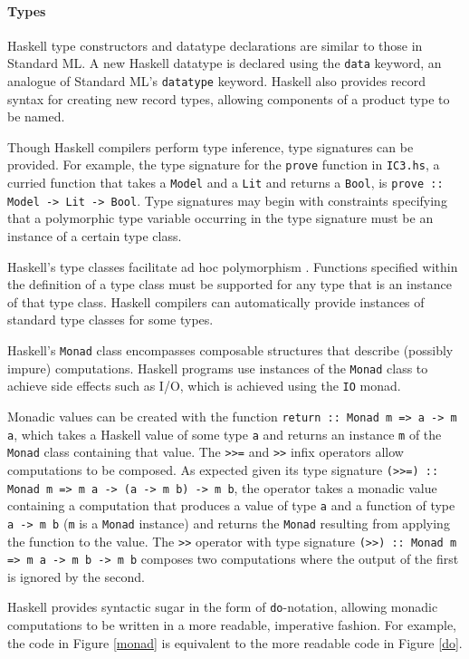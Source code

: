 \documentclass[12pt,a4paper,twoside,openright]{report}
\begin{document}
\paragraph{Types}{
Haskell type constructors and datatype declarations are similar to those in
Standard ML. A new Haskell datatype is declared using the \verb,data, keyword, an analogue
of Standard ML's \verb,datatype, keyword.
Haskell also provides record syntax for creating new record types, allowing components
of a product type to be named.

Though Haskell compilers perform type inference, type
signatures can be provided. For example, the type signature for
the \verb,prove, function in \verb,IC3.hs,, a curried function that takes
a \verb,Model, and a \verb,Lit, and returns a \verb,Bool,,
is \verb,prove :: Model -> Lit -> Bool,. Type signatures may begin with
constraints specifying that a polymorphic type variable occurring in the type
signature must be an instance of a certain type class.


Haskell's type classes facilitate ad hoc polymorphism \cite{hall94}.
Functions specified within the definition of a type class
must be supported for any type that is an instance of that type class.
Haskell compilers can automatically provide instances of standard
type classes for some types.

Haskell's \verb,Monad, class encompasses composable
structures that describe (possibly impure) computations.
Haskell programs use instances of the
\verb,Monad, class to achieve side effects such as I/O, which is
achieved using the \verb,IO, monad.

Monadic values can be created with the function
\verb,return :: Monad m => a -> m a,, which takes a Haskell
value of some type \verb,a, and returns an instance \verb,m, of the
\verb,Monad, class containing that value.
The \verb,>>=, and \verb,>>, infix operators allow computations to be composed.
As expected given its type signature
\verb,(>>=) :: Monad m => m a -> (a -> m b) -> m b,, the operator
takes a monadic value containing a computation that produces a value of type
\verb,a, and a function of type \verb,a -> m b, (\verb,m, is a \verb,Monad, instance)
and returns the \verb,Monad, resulting from applying the function to the value.
The \verb,>>, operator with type signature
\verb,(>>) :: Monad m => m a -> m b -> m b, composes two computations where
the output of the first is ignored by the second.

Haskell provides syntactic sugar
in the form of \verb,do,-notation, allowing monadic computations
to be written in a more readable, imperative fashion. For example, the code in Figure
\ref{monad} is equivalent to the more readable code in Figure \ref{do}.

}
\end{document}
